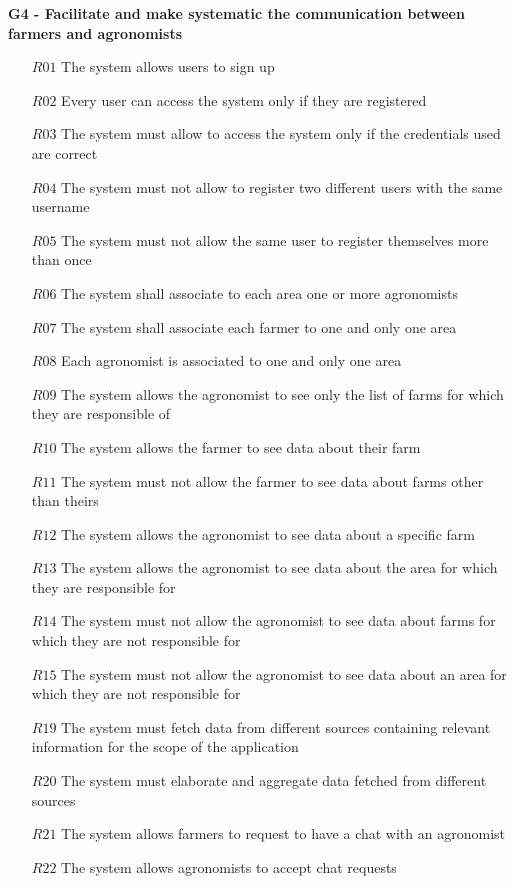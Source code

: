 \documentclass[10pt]{report}
\begin{document}
\textbf{G4 - Facilitate and make systematic the communication between farmers and agronomists}
\begin{itemize}
    \item [$R01$] The system allows users to sign up
    \item [$R02$] Every user can access the system only if they are registered
    \item [$R03$] The system must allow to access the system only if the credentials used are correct
    \item [$R04$] The system must not allow to register two different users with the same username
    \item [$R05$] The system must not allow the same user to register themselves more than once
    \item [$R06$] The system shall associate to each area one or more agronomists
    \item [$R07$] The system shall associate each farmer to one and only one area
    \item [$R08$] Each agronomist is associated to one and only one area
    \item [$R09$] The system allows the agronomist to see only the list of farms for which they are responsible of
    \item [$R10$] The system allows the farmer to see data about their farm
    \item [$R11$] The system must not allow the farmer to see data about farms other than theirs
    \item [$R12$] The system allows the agronomist to see data about a specific farm
    \item [$R13$] The system allows the agronomist to see data about the area for which they are responsible for
    \item [$R14$] The system must not allow the agronomist to see data about farms for which they are not responsible for
    \item [$R15$] The system must not allow the agronomist to see data about an area for which they are not responsible for
    \item [$R19$] The system must fetch data from different sources containing relevant information for the scope of the application
    \item [$R20$] The system must elaborate and aggregate data fetched from different sources
    \item [$R21$] The system allows farmers to request to have a chat with an agronomist
    \item [$R22$] The system allows agronomists to accept chat requests

\end{itemize}
\end{document}
